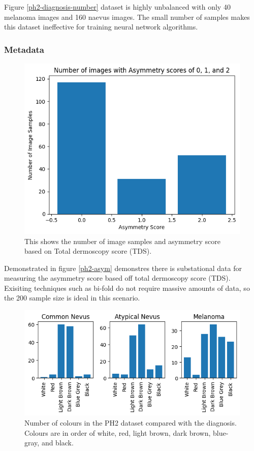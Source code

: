 Figure \ref{ph2-diagnosis-number} dataset is highly unbalanced with only 40 melanoma images and 160 naevus images. The small number of samples makes this dataset ineffective for training neural network algorithms.

\subsubsection{Metadata}

\begin{figure}
	\centering
	\includegraphics[scale=0.8]{images/ph2/ph2-asym-number.png}
	\caption{This shows the number of image samples and asymmetry score based on Total dermoscopy score (TDS).} 
\end{figure} \label{ph2-asym-number}

Demonstrated in figure \ref{ph2-asym} demonstres there is substational data for measuring the asymmetry score based off total dermoscopy score (TDS). Exisiting techniques such as bi-fold do not require massive amounts of data, so the 200 sample size is ideal in this scenario.

\begin{figure}
	\centering
	\includegraphics[scale=0.8]{images/ph2/ph2-colour-number.png}
	\caption{Number of colours in the PH2 dataset compared with the diagnosis. Colours are in order of white, red, light brown, dark brown, blue-gray, and black.} 
\end{figure} \label{ph2-colour-number}

